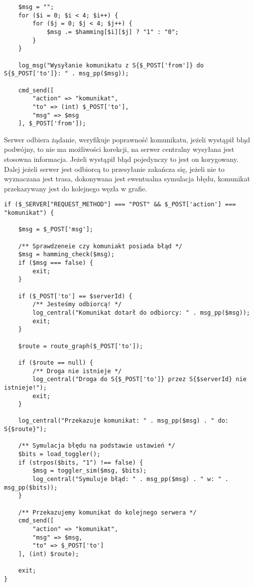\begin{empty}
	\begin{verbatim}
	$msg = "";
	for ($i = 0; $i < 4; $i++) {
		for ($j = 0; $j < 4; $j++) {
			$msg .= $hamming[$i][$j] ? "1" : "0";
		}
	}
	
	log_msg("Wysyłanie komunikatu z S{$_POST['from']} do S{$_POST['to']}: " . msg_pp($msg));
	
	cmd_send([
		"action" => "komunikat",
		"to" => (int) $_POST['to'],
		"msg" => $msg
	], $_POST['from']);
		\end{verbatim}
		\vspace{-10pt}
	\end{empty}
	
Serwer odbiera żądanie, weryfikuje poprawność komunikatu, jeżeli wystąpił błąd podwójny, to nie ma możliwości korekcji, na serwer centralny wysyłana jest stosowna informacja. Jeżeli wystąpił błąd pojedynczy to jest on korygowany. Dalej jeżeli serwer jest odbiorcą to przesyłanie zakańcza się, jeżeli nie to wyznaczana jest trasa, dokonywana jest ewentualna symulacja błędu, komunikat przekazywany jest do kolejnego węzła w grafie.  

\newpage
\begin{empty}
	\begin{verbatim}
if ($_SERVER["REQUEST_METHOD"] === "POST" && $_POST['action'] === "komunikat") {
	
	$msg = $_POST['msg'];
	
	/** Sprawdzeneie czy komuniakt posiada błąd */
	$msg = hamming_check($msg);
	if ($msg === false) {
		exit;
	}
	
	if ($_POST['to'] == $serverId) {
		/** Jesteśmy odbiorcą! */
		log_central("Komunikat dotarł do odbiorcy: " . msg_pp($msg));
		exit;
	}
	
	$route = route_graph($_POST['to']);
	
	if ($route == null) {
		/** Droga nie istnieje */
		log_central("Droga do S{$_POST['to']} przez S{$serverId} nie istnieje!");
		exit;
	}
	
	log_central("Przekazuje komunikat: " . msg_pp($msg) . " do: S{$route}");
	
	/** Symulacja błędu na podstawie ustawień */
	$bits = load_toggler();
	if (strpos($bits, "1") !== false) {
		$msg = toggler_sim($msg, $bits);
		log_central("Symuluje błąd: " . msg_pp($msg) . " w: " . msg_pp($bits));
	}
	
	/** Przekazujemy komunikat do kolejnego serwera */
	cmd_send([
		"action" => "komunikat",
		"msg" => $msg,
		"to" => $_POST['to']
	], (int) $route);
	
	exit;
}
	\end{verbatim}
	\vspace{-10pt}
\end{empty}

